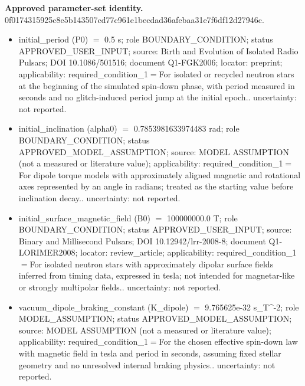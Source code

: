 \documentclass[11pt]{article}
\begin{document}
\noindent\textbf{Approved parameter-set identity.} 0f0174315925c8e5\allowbreak{}b143507cd77c961e\allowbreak{}1becdad36afebaa3\allowbreak{}1e7f6df12d27946c.
\begin{itemize}\raggedright
\item initial\_\allowbreak{}period (P0) \ensuremath{=} 0.5 s; role BOUNDARY\_\allowbreak{}CONDITION; status APPROVED\_\allowbreak{}USER\_\allowbreak{}INPUT; source: Birth and Evolution of Isolated Radio Pulsars; DOI 10.1086/\allowbreak{}501516; document Q1-FGK2006; locator: preprint; applicability: required\_\allowbreak{}condition\_\allowbreak{}1\ensuremath{=}For isolated or recycled neutron stars at the beginning of the simulated spin-down phase, with period measured in seconds and no glitch-induced period jump at the initial epoch.. uncertainty: not reported.
\item initial\_\allowbreak{}inclination (alpha0) \ensuremath{=} 0.7853981633974483 rad; role BOUNDARY\_\allowbreak{}CONDITION; status APPROVED\_\allowbreak{}MODEL\_\allowbreak{}ASSUMPTION; source: MODEL ASSUMPTION (not a measured or literature value); applicability: required\_\allowbreak{}condition\_\allowbreak{}1\ensuremath{=}For dipole torque models with approximately aligned magnetic and rotational axes represented by an angle in radians; treated as the starting value before inclination decay.. uncertainty: not reported.
\item initial\_\allowbreak{}surface\_\allowbreak{}magnetic\_\allowbreak{}field (B0) \ensuremath{=} 100000000.0 T; role BOUNDARY\_\allowbreak{}CONDITION; status APPROVED\_\allowbreak{}USER\_\allowbreak{}INPUT; source: Binary and Millisecond Pulsars; DOI 10.12942/\allowbreak{}lrr-2008-8; document Q1-LORIMER2008; locator: review\_\allowbreak{}article; applicability: required\_\allowbreak{}condition\_\allowbreak{}1\ensuremath{=}For isolated neutron stars with approximately dipolar surface fields inferred from timing data, expressed in tesla; not intended for magnetar-like or strongly multipolar fields.. uncertainty: not reported.
\item vacuum\_\allowbreak{}dipole\_\allowbreak{}braking\_\allowbreak{}constant (K\_\allowbreak{}dipole) \ensuremath{=} 9.765625e-32 s\_\allowbreak{}T\textasciicircum{}-2; role MODEL\_\allowbreak{}ASSUMPTION; status APPROVED\_\allowbreak{}MODEL\_\allowbreak{}ASSUMPTION; source: MODEL ASSUMPTION (not a measured or literature value); applicability: required\_\allowbreak{}condition\_\allowbreak{}1\ensuremath{=}For the chosen effective spin-down law with magnetic field in tesla and period in seconds, assuming fixed stellar geometry and no unresolved internal braking physics.. uncertainty: not reported.

\end{itemize}
\end{document}
